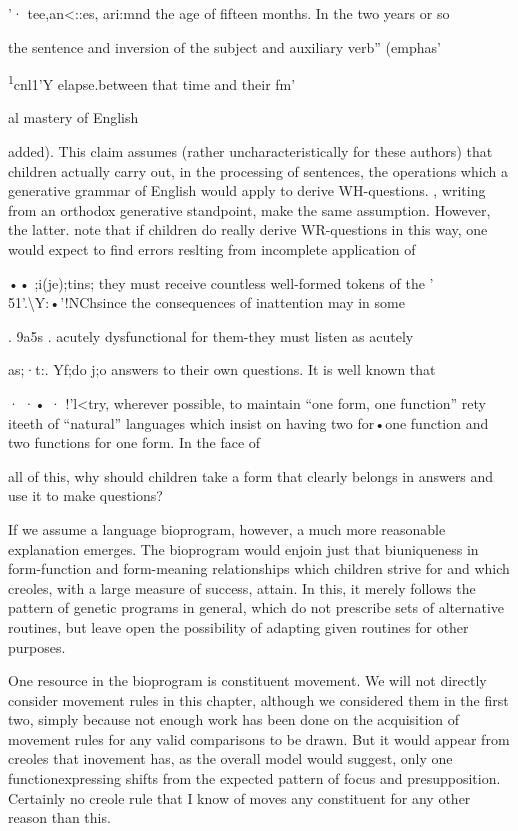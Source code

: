 '· tee,an{\textless}::es, ari:mnd the age of fifteen months. In the two years or so

the sentence and inversion of the subject and auxiliary verb'' (emphas'

\textsuperscript{1}cnl1'Y elapse.between that time and their fm'

al mastery of English

added). This claim assumes (rather uncharacteristically for these authors) that children actually carry out, in the processing of sentences, the operations which a generative grammar of English would apply to derive WH-questions. \citet{ErreichEtAl1980}, writing from an orthodox generative standpoint, make the same assumption. However, the latter. note that if children do really derive WR-questions in this way, one would expect to find errors reslting from incomplete application of

•• ;i(je);tins; they must receive countless well-formed tokens of the ' 51'.{\textbackslash}Y:•'!NChsince the consequences of inattention may in some

. 9a5s . acutely dysfunctional for them-they must listen as acutely

as;·t:. Yf;do j;o answers to their own questions. It is well known that

  · ·• · !'l{\textless}try, wherever possible, to maintain ``one form, one function'' rety iteeth of ``natural'' languages which insist on having two for•one function and two functions for one form. In the face of
 


all of this, why should children take a form that clearly belongs in answers and use it to make questions?

If we assume a language bioprogram, however, a much more reasonable explanation emerges. The bioprogram would enjoin just that biuniqueness in form-function and form-meaning relationships which children strive for and which creoles, with a large measure of success, attain. In this, it merely follows the pattern of genetic programs in general, which do not prescribe sets of alternative routines, but leave open the possibility of adapting given routines for other purposes.

One resource in the bioprogram is constituent movement. We will not directly consider movement rules in this chapter, although we considered them in the first two, simply because not enough work has been done on the acquisition of movement rules for any valid comparisons to be drawn. But it would appear from creoles that inove\-ment has, as the overall model would suggest, only one function\-expressing shifts from the expected pattern of focus and presupposi\-tion. Certainly no creole rule that I know of moves any constituent for any other reason than this.

